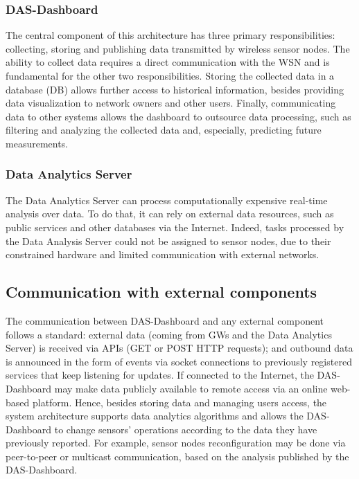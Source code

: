 \documentclass[conference, letterpaper]{IEEEtran}
\newcommand{\dashboard}[1]{DAS-Dashboard}
\newcommand{\gateway}[1]{GW#1}
\begin{document}
\subsubsection{\dashboard{}}
The central component of this architecture has three primary responsibilities: collecting, storing and publishing data transmitted by wireless sensor nodes. The ability to collect data requires a direct communication with the WSN and is fundamental for the other two responsibilities. Storing the collected data in a database (DB) allows further access to historical information, besides providing data visualization to network owners and other users. Finally, communicating data to other systems allows the dashboard to outsource data processing, such as filtering and analyzing the collected data and, especially, predicting future measurements.

\subsubsection{Data Analytics Server}
The Data Analytics Server can process computationally expensive real-time analysis over data. To do that, it can rely on external data resources, such as public services and other databases via the Internet. Indeed, tasks processed by the Data Analysis Server could not be assigned to sensor nodes, due to their constrained hardware and limited communication with external networks.

\subsection{Communication with external components}

The communication between \dashboard{} and any external component follows a standard: external data (coming from \gateway{s} and the Data Analytics Server) is received via APIs (GET or POST HTTP requests); and outbound data is announced in the form of events via socket connections to previously registered services that keep listening for updates. If connected to the Internet, the \dashboard{} may make data publicly available to remote access via an online web-based platform. Hence, besides storing data and managing users access, the system architecture supports data analytics algorithms and allows the \dashboard{} to change sensors' operations according to the data they have previously reported. For example, sensor nodes reconfiguration may be done via peer-to-peer or multicast communication, based on the analysis published by the \dashboard{}.
\end{document}
